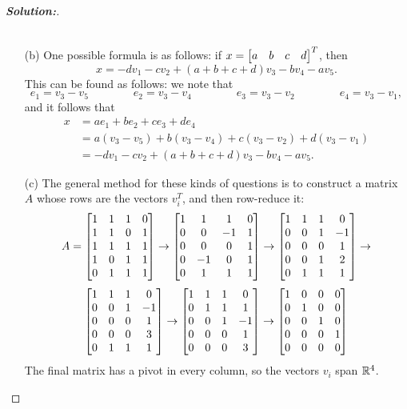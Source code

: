 \documentclass[a4paper]{amsart}
\theoremstyle{definition}
\newenvironment{solution}{\begin{proof}[\textbf{Solution:}] \vphantom{u}}{\end{proof}}
\begin{document}
\begin{solution}
\begin{itemize}
\begin{align*}
   \end{align*}
  \item[(b)] One possible formula is as follows: if
   $x=\left[\begin{matrix} a & b & c & d\end{matrix}\right]^T$, then
   \[ x = -dv_1 -cv_2 +(a+b+c+d)v_3 - bv_4 -av_5. \]
   This can be found as follows: we note that
   \[ e_1 = v_3 - v_5 \hspace{4em}
      e_2 = v_3 - v_4 \hspace{4em}
      e_3 = v_3 - v_2 \hspace{4em}
      e_4 = v_3 - v_1,
   \]
   and it follows that
   \begin{align*}
    x &= a e_1 + b e_2 + c e_3 + d e_4 \\
      &= a(v_3-v_5) + b(v_3-v_4) + c(v_3-v_2) + d(v_3-v_1) \\
      &= -dv_1 -cv_2 +(a+b+c+d)v_3 - bv_4 -av_5.
   \end{align*}
  \item[(c)] The general method for these kinds of questions is to
   construct a matrix $A$ whose rows are the vectors $v_i^T$, and then
   row-reduce it:
   \[ A = \left[\begin{matrix} 1 & 1 & 1 & 0 \\ 
               1 & 1 & 0 & 1 \\
               1 & 1 & 1 & 1 \\
               1 & 0 & 1 & 1 \\
               0 & 1 & 1 & 1 \end{matrix}\right] \to
          \left[\begin{matrix} 1 & 1 & 1 & 0 \\ 
               0 & 0 &-1 & 1 \\
               0 & 0 & 0 & 1 \\
               0 &-1 & 0 & 1 \\
               0 & 1 & 1 & 1 \end{matrix}\right] \to
          \left[\begin{matrix} 1 & 1 & 1 & 0 \\ 
               0 & 0 & 1 &-1 \\
               0 & 0 & 0 & 1 \\
               0 & 0 & 1 & 2 \\
               0 & 1 & 1 & 1 \end{matrix}\right] \to
   \] \[
          \left[\begin{matrix} 1 & 1 & 1 & 0 \\ 
               0 & 0 & 1 &-1 \\
               0 & 0 & 0 & 1 \\
               0 & 0 & 0 & 3 \\
               0 & 1 & 1 & 1 \end{matrix}\right] \to
          \left[\begin{matrix} 1 & 1 & 1 & 0 \\ 
               0 & 1 & 1 & 1 \\
               0 & 0 & 1 &-1 \\
               0 & 0 & 0 & 1 \\
               0 & 0 & 0 & 3 \end{matrix}\right] \to
          \left[\begin{matrix} 1 & 0 & 0 & 0 \\ 
               0 & 1 & 0 & 0 \\
               0 & 0 & 1 & 0 \\
               0 & 0 & 0 & 1 \\
               0 & 0 & 0 & 0 \end{matrix}\right]
   \]
   The final matrix has a pivot in every column, so the vectors $v_i$
   span ${\mathbb{R}}^4$. 
 \end{itemize}
\end{solution}
\end{document}
